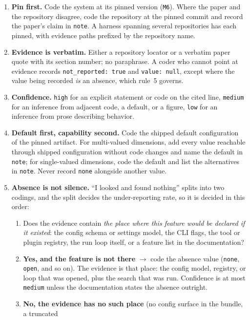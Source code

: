 \begin{enumerate}
\item \textbf{Pin first.} Code the system at its pinned version (\texttt{M6}). Where the paper and
  the repository disagree, code the repository at the pinned commit and record the paper's claim in
  \texttt{note}. A harness spanning several repositories has each pinned, with evidence paths
  prefixed by the repository name.
\item \textbf{Evidence is verbatim.} Either a repository locator or a verbatim paper quote with its
  section number; no paraphrase. A coder who cannot point at evidence records
  \texttt{not\_reported: true} and \texttt{value: null}, except where the value being recorded
  \emph{is} an absence, which rule~5 governs.
\item \textbf{Confidence.} \texttt{high} for an explicit statement or code on the cited line,
  \texttt{medium} for an inference from adjacent code, a default, or a figure, \texttt{low} for an
  inference from prose describing behavior.
\item \textbf{Default first, capability second.} Code the shipped default configuration of the
  pinned artifact. For multi-valued dimensions, add every value reachable through shipped
  configuration without code changes and name the default in \texttt{note}; for single-valued
  dimensions, code the default and list the alternatives in \texttt{note}. Never record
  \texttt{none} alongside another value.
\item \textbf{Absence is not silence.} ``I looked and found nothing'' splits into two codings, and
  the split decides the under-reporting rate, so it is decided in this order:
  \begin{enumerate}
  \item Does the evidence contain \emph{the place where this feature would be declared if it
    existed}: the config schema or settings model, the CLI flags, the tool or plugin registry,
    the run loop itself, or a feature list in the documentation?
  \item \textbf{Yes, and the feature is not there} $\rightarrow$ code the absence value
    (\texttt{none}, \texttt{open}, and so on). The evidence is that place: the config model,
    registry, or loop that was opened, plus the search that was run. Confidence is at most
    \texttt{medium} unless the documentation states the absence outright.
  \item \textbf{No, the evidence has no such place} (no config surface in the bundle, a truncated

\end{enumerate}
\end{enumerate}
